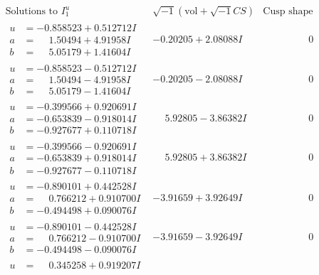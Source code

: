 \documentclass[1p]{elsarticle_modified}
\theoremstyle{definition}
\newcommand{\I}{\sqrt{-1}}
\begin{document}
$$\begin{array}{c|c|c}  
\text{Solutions to }I^u_{1}& \I (\text{vol} + \sqrt{-1}CS) & \text{Cusp shape}\\
 \hline 
\begin{aligned}
u &= -0.858523 + 0.512712 I \\
a &= \phantom{-}1.50494 + 4.91958 I \\
b &= \phantom{-}5.05179 + 1.41604 I\end{aligned}
 & -0.20205 + 2.08088 I & \phantom{-0.000000 } 0 \\ \hline\begin{aligned}
u &= -0.858523 - 0.512712 I \\
a &= \phantom{-}1.50494 - 4.91958 I \\
b &= \phantom{-}5.05179 - 1.41604 I\end{aligned}
 & -0.20205 - 2.08088 I & \phantom{-0.000000 } 0 \\ \hline\begin{aligned}
u &= -0.399566 + 0.920691 I \\
a &= -0.653839 - 0.918014 I \\
b &= -0.927677 + 0.110718 I\end{aligned}
 & \phantom{-}5.92805 - 3.86382 I & \phantom{-0.000000 } 0 \\ \hline\begin{aligned}
u &= -0.399566 - 0.920691 I \\
a &= -0.653839 + 0.918014 I \\
b &= -0.927677 - 0.110718 I\end{aligned}
 & \phantom{-}5.92805 + 3.86382 I & \phantom{-0.000000 } 0 \\ \hline\begin{aligned}
u &= -0.890101 + 0.442528 I \\
a &= \phantom{-}0.766212 + 0.910700 I \\
b &= -0.494498 + 0.090076 I\end{aligned}
 & -3.91659 + 3.92649 I & \phantom{-0.000000 } 0 \\ \hline\begin{aligned}
u &= -0.890101 - 0.442528 I \\
a &= \phantom{-}0.766212 - 0.910700 I \\
b &= -0.494498 - 0.090076 I\end{aligned}
 & -3.91659 - 3.92649 I & \phantom{-0.000000 } 0 \\ \hline\begin{aligned}
u &= \phantom{-}0.345258 + 0.919207 I \\

\end{aligned}
\end{array}$$
\end{document}
